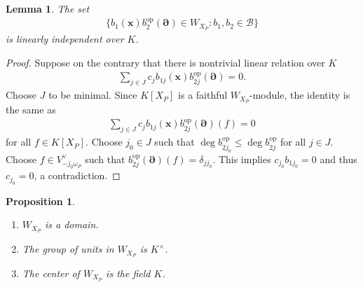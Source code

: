 \documentclass[11pt,a4paper,usenames,dvipsnames,reqno]{amsart}
\numberwithin{equation}{section}
\newtheorem{Prop}[Thm]{Proposition}
\newtheorem{Lem}[Thm]{Lemma}
\theoremstyle{definition}
\theoremstyle{remark}
\begin{document}
\begin{Lem}\label{lem:naivebase}
The set
\begin{align*}
    \big\{ b_1(\mathbf{x})b_2^{\mathrm{op}}(\mathbf{\partial})\in W_{X_P}: b_1,b_2\in \mathcal{B}\big\}
\end{align*}
is linearly independent over $K$.
\end{Lem}

\begin{proof}
Suppose on the contrary that there is nontrivial linear relation over $K$
\begin{align*}
    \sum_{j\in J} c_jb_{1j}(\mathbf{x})b_{2j}^{\mathrm{op}}(\mathbf{\partial})=0.
\end{align*}
Choose $J$ to be minimal.  Since $K[X_P]$ is a faithful $W_{X_P}$-module, the identity is the same as
\begin{align*}
    \sum_{j\in J} c_jb_{1j}(\mathbf{x})b_{2j}^{\mathrm{op}}(\mathbf{\partial})(f)=0
\end{align*}
for all $f\in K[X_P].$ Choose $j_0\in J$ such that $\deg b_{2j_0}^{\mathrm{op}}\le \deg b_{2j}^{\mathrm{op}}$ for all $j\in J$. Choose $f\in V_{-j_0\omega_P}^\lor$ such that $b_{2j}^{\mathrm{op}}(\mathbf{\partial})(f)=\delta_{jj_0}.$ This implies $c_{j_0}b_{1j_0}=0$ and thus $c_{j_0}=0$, a contradiction. 
\end{proof}


\begin{Prop}
\begin{enumerate}
    \item $W_{X_P}$ is a domain.
    \item The group of units in $W_{X_P}$ is $K^\times$.
    \item The center of $W_{X_P}$ is the field $K$.
\end{enumerate}
\end{Prop}
\end{document}
